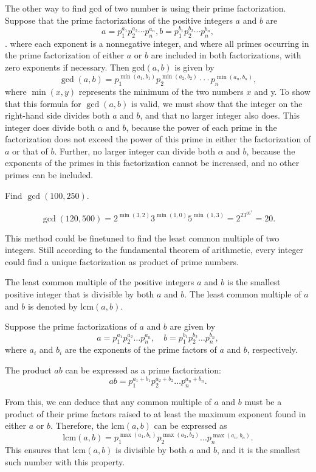     The other way to find gcd of two number is using their prime factorization. Suppose that the prime factorizations of the positive integers $a$ and 
    $b$ are $$a=p_1^{a_1}p_2^{a_2}\cdots p_n^{a_n},b=p_1^{b_1}p_2^{b_2}\cdots p_n^{b_n},$$.
    where each exponent is a nonnegative integer, and where all primes occurring in the prime factorization of either 
    $a$ or $b$ are included in both factorizations, with zero exponents if necessary. Then gcd$(a, b)$ is given by
    $$\gcd(a,b)=p_1^{\min(a_1,b_1)}p_2^{\min(a_2,b_2)}\cdotp\cdotp\cdotp p_n^{\min(a_n,b_n)},$$
    where $\min(x,y)$ represents the minimum of the two numbers $x$ and y. To show that this formula for 
    $\gcd(a,b)$ is valid, we must show that the integer on the right-hand side divides both $a$ and $b$, and that no larger integer also does. This integer does divide both $\alpha$ and $b$, because the power of each prime in the factorization does not exceed the power of this prime in either the factorization of $a$ or that of $b$. Further, no larger integer can divide both $\alpha$ and $b$, because the exponents of the primes in this factorization cannot be increased, and no other primes can be included.
    \begin{example}
        Find $\gcd(100, 250)$.

        $$\gcd(120,500)=2^{\min(3,2)}3^{\min(1,0)}5^{\min(1,3)}=2^23^05^1=20.$$
    \end{example}  

    This method could be finetuned to find the least common multiple of two integers. Still according to the fundamental
    theorem of arithmetic, every integer could find a unique factorization as product of prime numbers.
    \begin{definition}
        The least common multiple of the positive integers $a$ and $b$ is the smallest positive integer that is 
        divisible by both $a$ and $b$. The least common multiple of $a$ and $b$ is denoted by lcm$(a, b)$.
    \end{definition}
        Suppose the prime factorizations of \(a\) and \(b\) are given by
        \[ a = p_1^{a_1} p_2^{a_2} \ldots p_n^{a_n}, \quad b = p_1^{b_1} p_2^{b_2} \ldots p_n^{b_n}, \]
        where \(a_i\) and \(b_i\) are the exponents of the prime factors of \(a\) and \(b\), respectively.

        The product \(ab\) can be expressed as a prime factorization:
        \[ ab = p_1^{a_1+b_1} p_2^{a_2+b_2} \ldots p_n^{a_n+b_n}. \]

        From this, we can deduce that any common multiple of \(a\) and \(b\) must be a product of their prime factors raised to at least the maximum exponent found in either \(a\) or \(b\). Therefore, the \(\text{lcm}(a, b)\) can be expressed as
        \[ \text{lcm}(a, b) = p_1^{\max(a_1,b_1)} p_2^{\max(a_2,b_2)} \ldots p_n^{\max(a_n,b_n)}. \]
        This ensures that \(\text{lcm}(a, b)\) is divisible by both \(a\) and \(b\), and it is the smallest such number with this property.

